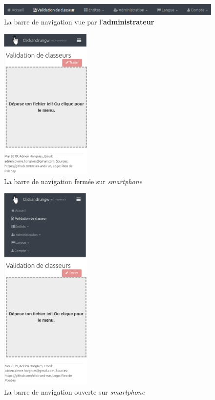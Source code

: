 \begin{figure}[ht]
    \centering
    \includegraphics[width=1\textwidth]{images/screenshot/navbar-admin.png}
    \caption{La barre de navigation vue par l'\textbf{administrateur}}
    \label{fig:navbar-admin}
\end{figure}

\begin{figure}[ht]
    \centering
    \includegraphics[width=0.4\textwidth]{images/screenshot/navbar-hamburger-closed.png}
    \caption{La barre de navigation fermée sur \textit{smartphone}}
    \label{fig:navbar-hamburger-closed}
\end{figure}

\begin{figure}[ht]
    \centering
    \includegraphics[width=0.4\textwidth]{images/screenshot/navbar-hamburger-open.png}
    \caption{La barre de navigation ouverte sur \textit{smartphone}}
    \label{fig:navbar-hamburger-opened}
\end{figure}

